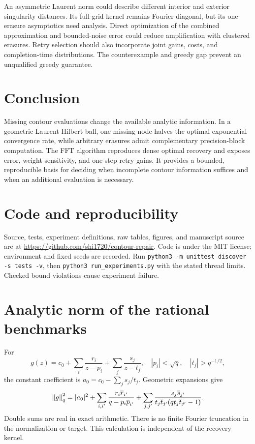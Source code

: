 \documentclass[final,leqno,letterpaper]{etna}
\begin{document}
An asymmetric Laurent norm could describe different interior and exterior singularity distances. Its full-grid kernel remains Fourier diagonal, but its one-erasure asymptotics need analysis. Direct optimization of the combined approximation and bounded-noise error could reduce amplification with clustered erasures. Retry selection should also incorporate joint gains, costs, and completion-time distributions. The counterexample and greedy gap prevent an unqualified greedy guarantee.

\FloatBarrier
\section{Conclusion}
Missing contour evaluations change the available analytic information. In a geometric Laurent Hilbert ball, one missing node halves the optimal exponential convergence rate, while arbitrary erasures admit complementary precision-block computation. The FFT algorithm reproduces dense optimal recovery and exposes error, weight sensitivity, and one-step retry gains. It provides a bounded, reproducible basis for deciding when incomplete contour information suffices and when an additional evaluation is necessary.

\section*{Code and reproducibility}
Source, tests, experiment definitions, raw tables, figures, and manuscript source are at \url{https://github.com/shi1720/contour-repair}. Code is under the MIT license; environment and fixed seeds are recorded. Run \texttt{python3 -m unittest discover -s tests -v}, then \texttt{python3 run\_experiments.py} with the stated thread limits. Checked bound violations cause experiment failure.

\FloatBarrier
\appendix
\FloatBarrier
\section{Analytic norm of the rational benchmarks}
For
\[
g(z)=c_0+\sum_i\frac{r_i}{z-p_i}+\sum_j\frac{s_j}{z-t_j},
\quad |p_i|<\sqrt q,\quad |t_j|>q^{-1/2},
\]
the constant coefficient is $a_0=c_0-\sum_js_j/t_j$. Geometric expansions give
\begin{equation*}
\left\lVert g\right\rVert_q^2=|a_0|^2+
\sum_{i,i'}\frac{r_i\overline r_{i'}}{q-p_i\overline p_{i'}}+
\sum_{j,j'}\frac{s_j\overline s_{j'}}{t_j\overline t_{j'}(qt_j\overline t_{j'}-1)}.
\end{equation*}
Double sums are real in exact arithmetic. There is no finite Fourier truncation in the normalization or target. This calculation is independent of the recovery kernel.
\end{document}
